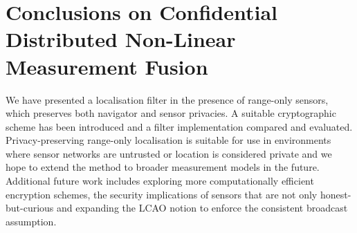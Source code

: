 \section{Conclusions on Confidential Distributed Non-Linear Measurement Fusion}\label{sec:nonlin_fusion:conclusion}
We have presented a localisation filter in the presence of range-only sensors, which preserves both navigator and sensor privacies. A suitable cryptographic scheme has been introduced and a filter implementation compared and evaluated. Privacy-preserving range-only localisation is suitable for use in environments where sensor networks are untrusted or location is considered private and we hope to extend the method to broader measurement models in the future. Additional future work includes exploring more computationally efficient encryption schemes, the security implications of sensors that are not only honest-but-curious and expanding the LCAO notion to enforce the consistent broadcast assumption.